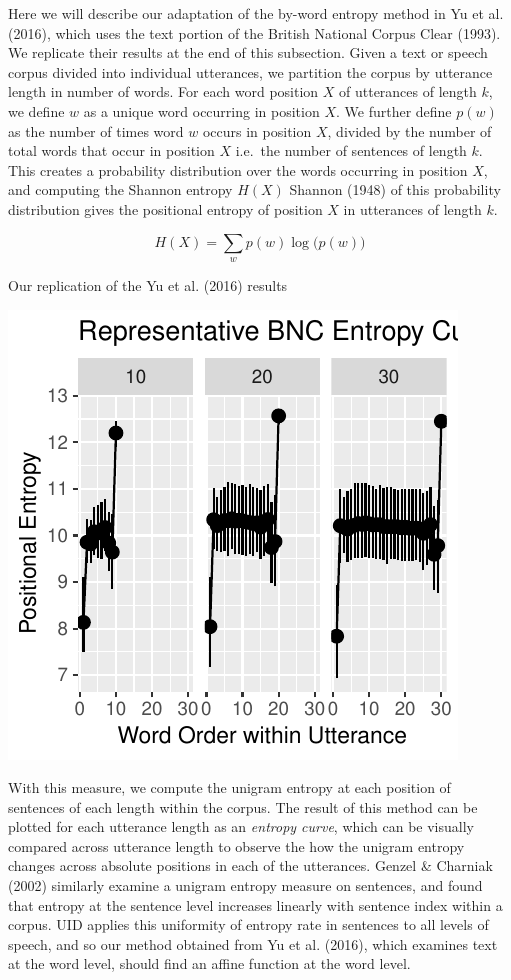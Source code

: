 \documentclass[10pt, letterpaper]{article}
\newenvironment{CodeChunk}{}{}
\begin{document}
Here we will describe our adaptation of the by-word entropy method in Yu
et al. (2016), which uses the text portion of the British National
Corpus Clear (1993). We replicate their results at the end of this
subsection. Given a text or speech corpus divided into individual
utterances, we partition the corpus by utterance length in number of
words. For each word position \(X\) of utterances of length \(k\), we
define \(w\) as a unique word occurring in position \(X\). We further
define \(p(w)\) as the number of times word \(w\) occurs in position
\(X\), divided by the number of total words that occur in position \(X\)
i.e.~the number of sentences of length \(k\). This creates a probability
distribution over the words occurring in position \(X\), and computing
the Shannon entropy \(H(X)\) Shannon (1948) of this probability
distribution gives the positional entropy of position \(X\) in
utterances of length \(k\).

\[H(X) = \sum\limits_w p(w)\log\big(p(w)\big)\]

Our replication of the Yu et al. (2016) results

\begin{CodeChunk}

\includegraphics{figs/read_and_plot_bnc-1} \end{CodeChunk}

With this measure, we compute the unigram entropy at each position of
sentences of each length within the corpus. The result of this method
can be plotted for each utterance length as an \emph{entropy curve},
which can be visually compared across utterance length to observe the
how the unigram entropy changes across absolute positions in each of the
utterances. Genzel \& Charniak (2002) similarly examine a unigram
entropy measure on sentences, and found that entropy at the sentence
level increases linearly with sentence index within a corpus. UID
applies this uniformity of entropy rate in sentences to all levels of
speech, and so our method obtained from Yu et al. (2016), which examines
text at the word level, should find an affine function at the word
level.
\end{document}
